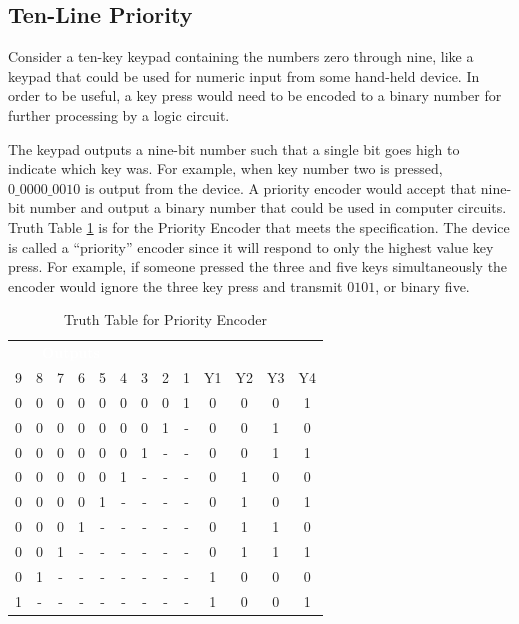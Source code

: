 \subsection{Ten-Line Priority}
\label{CL:subsec:10_line_priority}


Consider a ten-key keypad containing the numbers zero through nine, like a keypad that could be used for numeric input from some hand-held device. In order to be useful, a key press would need to be encoded to a binary number for further processing by a logic circuit. 

The keypad outputs a nine-bit number such that a single bit goes high to indicate which key was. For example, when key number two is pressed, $ 0\_0000\_0010 $ is output from the device. A priority encoder would accept that nine-bit number and output a binary number that could be used in computer circuits. Truth Table \ref{CL:tab:truth_table_for_priority_encoder} is for the Priority Encoder that meets the specification. The device is called a ``priority'' encoder since it will respond to only the highest value key press. For example, if someone pressed the three and five keys simultaneously the encoder would ignore the three key press and transmit $ 0101 $, or binary five.

\begin{table}[H]
  \sffamily
  \newcommand{\head}[1]{\textcolor{white}{\textbf{#1}}}    
  \begin{center}
    \begin{tabular}{ccccccccc|cccc} 
      \rowcolor{black!75}
      \multicolumn{9}{c}{\head{Inputs}} & \multicolumn{4}{c}{\head{Outputs}} \\
      9 & 8 & 7 & 6 & 5 & 4 & 3 & 2 & 1 & Y1 & Y2 & Y3 & Y4 \\
      \hline
      0 & 0 & 0 & 0 & 0 & 0 & 0 & 0 & 1 & 0 & 0 & 0 & 1 \\
      0 & 0 & 0 & 0 & 0 & 0 & 0 & 1 & - & 0 & 0 & 1 & 0 \\
      0 & 0 & 0 & 0 & 0 & 0 & 1 & - & - & 0 & 0 & 1 & 1 \\
      0 & 0 & 0 & 0 & 0 & 1 & - & - & - & 0 & 1 & 0 & 0 \\
      0 & 0 & 0 & 0 & 1 & - & - & - & - & 0 & 1 & 0 & 1 \\
      0 & 0 & 0 & 1 & - & - & - & - & - & 0 & 1 & 1 & 0 \\
      0 & 0 & 1 & - & - & - & - & - & - & 0 & 1 & 1 & 1 \\
      0 & 1 & - & - & - & - & - & - & - & 1 & 0 & 0 & 0 \\
      1 & - & - & - & - & - & - & - & - & 1 & 0 & 0 & 1
    \end{tabular}
  \end{center}
  \caption{Truth Table for Priority Encoder}
  \label{CL:tab:truth_table_for_priority_encoder}
\end{table}

